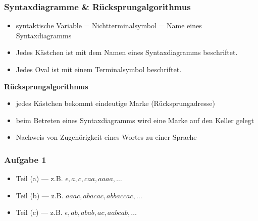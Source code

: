 \documentclass{beamer}
\begin{document}
\begin{frame} \frametitle{Syntaxdiagramme \& Rücksprungalgorithmus}
	\small
	\begin{itemize}
		\item syntaktische Variable = Nichtterminalsymbol = Name eines Syntaxdiagramms
		\item Jedes Kästchen ist mit dem Namen eines Syntaxdiagramms beschriftet.
		\item Jedes Oval ist mit einem Terminalsymbol beschriftet.
	\end{itemize}

	\pause

	\textbf{Rücksprungalgorithmus}
	\begin{itemize}
		\item jedes Kästchen bekommt eindeutige Marke (Rücksprungadresse)
		\item beim Betreten eines Syntaxdiagramms wird eine Marke auf den Keller gelegt
		\item Nachweis von Zugehörigkeit eines Wortes zu einer Sprache
	\end{itemize}
\end{frame}

\begin{frame} \frametitle{Aufgabe 1}
	\begin{itemize}
		\item Teil (a) ---
		z.B. $\epsilon, a, c, caa, aaaa, \dots$
		\item Teil (b) ---
		z.B. $aaac, abacac, abbaccac, \dots$
		\item 	Teil (c) ---
		z.B. $\epsilon, ab, abab, ac, aabcab, \dots$
	\end{itemize}
\end{frame}
\end{document}
